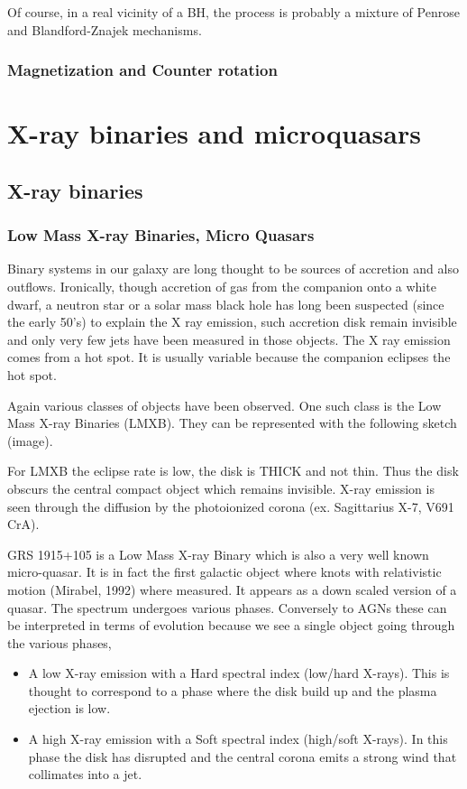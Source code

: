 \documentclass[10pt,a4paper,english]{article}
\begin{document}
Of course, in a real vicinity of a BH, the process is probably a
mixture of Penrose and Blandford-Znajek mechanisms.
\subsubsection{Magnetization and Counter rotation}


\section{X-ray binaries and microquasars}
\subsection{X-ray binaries}
\subsubsection{Low Mass X-ray Binaries, Micro Quasars}
Binary systems in our galaxy are long thought to be sources of
accretion and also outflows. Ironically, though accretion of gas from
the companion onto a white dwarf, a neutron star or a solar mass black
hole has long been suspected (since the early 50's) to explain the X
ray emission, such accretion disk remain invisible and only very few
jets have been measured in those objects. The X ray emission comes
from a hot spot. It is usually variable because the companion eclipses
the hot spot.

Again various classes of objects have been observed. One such class is
the Low Mass X-ray Binaries (LMXB). They can be represented with the
following sketch (image).

For LMXB the eclipse rate is low, the disk is THICK and not thin. Thus
the disk obscurs the central compact object which remains
invisible. X-ray emission is seen through the diffusion by the
photoionized corona (ex. Sagittarius X-7, V691 CrA).

GRS 1915+105 is a Low Mass X-ray Binary which is also a very well
known micro-quasar. It is in fact the first galactic object where
knots with relativistic motion (Mirabel, 1992) where measured. It
appears as a down scaled version of a quasar. The spectrum undergoes
various phases. Conversely to AGNs these can be interpreted in terms
of evolution because we see a single object going through the various
phases,

\begin{itemize}
\item A low X-ray emission with a Hard spectral index (low/hard
  X-rays). This is thought to correspond to a phase where the disk
  build up and the plasma ejection is low.
\item A high X-ray emission with a Soft spectral index (high/soft
  X-rays). In this phase the disk has disrupted and the central corona
  emits a strong wind that collimates into a jet.
\end{itemize}
\end{document}
